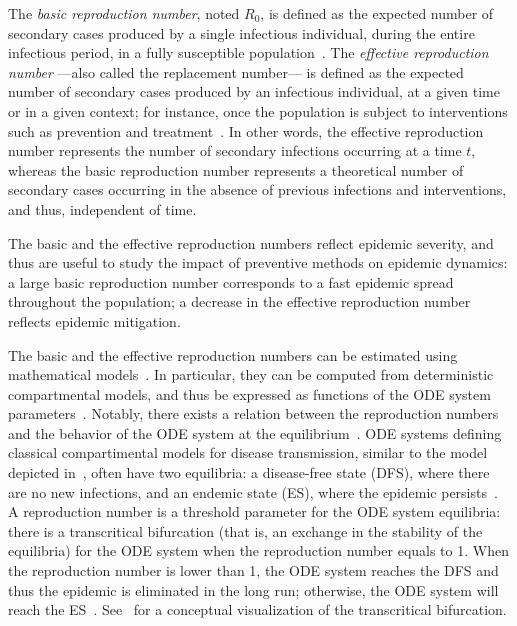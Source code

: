 The \textit{basic reproduction number}, noted $R_0$, is defined as the expected number of secondary cases produced by a single infectious individual, during the entire infectious period, in a fully susceptible population~\cite[]{Anderson1991,Heesterbeek2002}. The \textit{effective reproduction number} ---also called the replacement number--- is defined as the expected number of secondary cases produced by an infectious individual, at a given time or in a given context; for instance, once the population is subject to interventions such as prevention and treatment~\cite[]{Ridenhour2018,VanDenDriessche2008,VanDenDriessche2002,Hethcote2000}. In other words, the effective reproduction number represents the number of secondary infections occurring at a time $t$, whereas the basic reproduction number represents a theoretical number of secondary cases occurring in the absence of previous infections and interventions, and thus, independent of time. 

The basic and the effective reproduction numbers reflect epidemic severity, and thus are useful to study the impact of preventive methods on epidemic dynamics: a large basic reproduction number corresponds to a fast epidemic spread throughout the population; a decrease in the effective reproduction number reflects epidemic mitigation. 

The basic and the effective reproduction numbers can be estimated using mathematical models~\cite[]{Ridenhour2018,Guerra2017}. In particular, they can be computed from deterministic compartmental models, and thus be expressed as functions of the ODE system parameters~\cite[]{Heffernan2005,VanDenDriessche2002,VanDenDriessche2008}. Notably, there exists a relation between the reproduction numbers and the behavior of the ODE system at the equilibrium~\cite[]{VanDenDriessche2002}. ODE systems defining classical compartimental models for disease transmission, similar to the model depicted in~, often have two equilibria: a disease-free state (DFS), where there are no new infections, and an endemic state (ES), where the epidemic persists~\cite[]{Hethcote2000,VanDenDriessche2002}. A reproduction number is a threshold parameter for the ODE system equilibria: there is a transcritical bifurcation (that is, an exchange in the stability of the equilibria) for the ODE system when the reproduction number equals to 1. When the reproduction number is lower than 1, the ODE system reaches the DFS and thus the epidemic is eliminated in the long run; otherwise, the ODE system will reach the ES~\cite[]{Hethcote2000,VanDenDriessche2002}. See~ for a conceptual visualization of the transcritical bifurcation.

